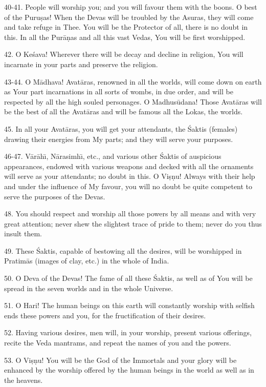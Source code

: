 40-41. People will worship you; and you will favour them with the boons. O best of the Puru\d{s}as! When the Devas will be troubled by the Asuras, they will come and take refuge in Thee. You will be the Protector of all, there is no doubt in this. In all the Pur\=a\d{n}as and all this vast Vedas, You will be first worshipped.

42. O Ke\'sava! Wherever there will be decay and decline in religion, You will incarnate in your parts and preserve the religion.

43-44. O M\=adhava! Avat\=aras, renowned in all the worlds, will come down on earth as Your part incarnations in all sorts of wombs, in due order, and will be respected by all the high souled personages. O Madhus\=udana! Those Avat\=aras will be the best of all the Avat\=aras and will be famous all the Lokas, the worlds.

45. In all your Avat\=aras, you will get your attendants, the \'Saktis (females) drawing their energies from My parts; and they will serve your purposes.

46-47. V\=ar\=ah\={\i}, N\=arasimh\={\i}, etc., and various other \'Saktis of auspicious appearances, endowed with various weapons and decked with all the ornaments will serve as your attendants; no doubt in this. O Vi\d{s}\d{n}u! Always with their help and under the influence of My favour, you will no doubt be quite competent to serve the purposes of the Devas.

48. You should respect and worship all those powers by all means and with very great attention; never shew the slightest trace of pride to them; never do you thus insult them.

49. These \'Saktis, capable of bestowing all the desires, will be worshipped in Pratim\=as (images of clay, etc.) in the whole of India.

50. O Deva of the Devas! The fame of all these \'Saktis, as well as of You will be spread in the seven worlds and in the whole Universe.

51. O Hari! The human beings on this earth will constantly worship with selfish ends these powers and you, for the fructification of their desires.

52. Having various desires, men will, in your worship, present various offerings, recite the Veda mantrams, and repeat the names of you and the powers.

53. O Vi\d{s}\d{n}u! You will be the God of the Immortals and your glory will be enhanced by the worship offered by the human beings in the world as well as in the heavens.

